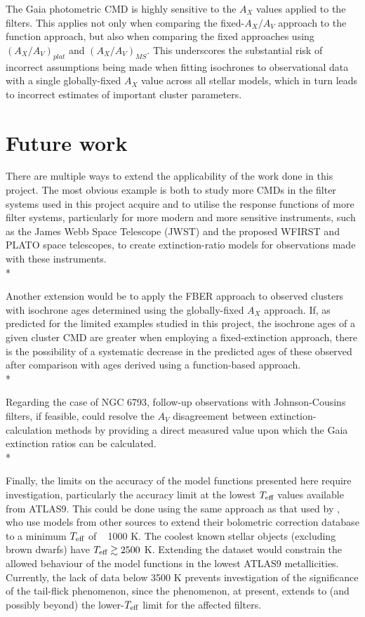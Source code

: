 \documentclass[12pt, a4paper]{report}
\begin{document}
The Gaia photometric CMD is highly sensitive to the $A_{X}$ values applied to the filters. This applies not only when comparing the fixed-$A_{X}/A_{V}$ approach to the function approach, but also when comparing the fixed approaches using $(A_{X}/A_{V})_{plat}$ and $(A_{X}/A_{V})_{MS}$. This underscores the substantial risk of incorrect assumptions being made when fitting isochrones to observational data with a single globally-fixed $A_{X}$ value across all stellar models, which in turn leads to incorrect estimates of important cluster parameters.

\section{Future work}
There are multiple ways to extend the applicability of the work done in this project. The most obvious example is both to study more CMDs in the filter systems used in this project acquire and to utilise the response functions of more filter systems, particularly for more modern and more sensitive instruments, such as the James Webb Space Telescope (JWST) and the proposed WFIRST and PLATO space telescopes, to create extinction-ratio models for observations made with these instruments.\\*

Another extension would be to apply the FBER approach to observed clusters with isochrone ages determined using the globally-fixed $A_{X}$ approach. If, as predicted for the limited examples studied in this project, the isochrone ages of a given cluster CMD are greater when employing a fixed-extinction approach, there is the possibility of a systematic decrease in the predicted ages of these observed after comparison with ages derived using a function-based approach.\\*

Regarding the case of NGC 6793, follow-up observations with Johnson-Cousins filters, if feasible, could resolve the $A_{V}$ disagreement between extinction-calculation methods by providing a direct measured value upon which the Gaia extinction ratios can be calculated.\\*

Finally, the limits on the accuracy of the model functions presented here require investigation, particularly the accuracy limit at the lowest $T_{\textnormal{eff}}$ values available from ATLAS9. This could be done using the same approach as that used by \cite{2008PASP..120..583G}, who use models from other sources to extend their bolometric correction database to a minimum $T_{\textnormal{eff}}$ of ~ 1000 K. The coolest known stellar objects (excluding brown dwarfs) have $T_{\textnormal{eff}} \gtrsim 2500$ K. Extending the dataset would constrain the allowed behaviour of the model functions in the lowest ATLAS9 metallicities. Currently, the lack of data below 3500 K prevents investigation of the significance of the tail-flick phenomenon, since the phenomenon, at present, extends to (and possibly beyond) the lower-$T_{\textnormal{eff}}$ limit for the affected filters.

%

\end{document}
